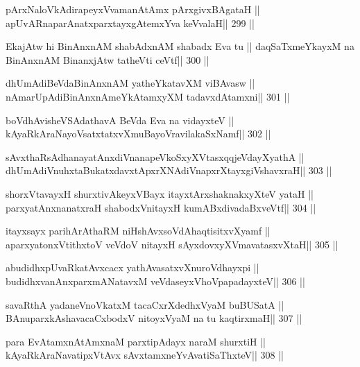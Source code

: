 \begin{shl}
pArxNaloVkAdirapeyxVvamanAtAmx pArxgivxBAgataH ||
apUvARnaparAnatxparxtayxgAtemxYva keVvalaH\hfill || 299 ||
\end{shl}

\begin{shl}
EkajAtw hi BinAnxnAM shabAdxnAM shabadx Eva tu ||
daqSaTxmeYkayxM na BinAnxnAM BinanxjAtw tatheVti ceVtf\hfill || 300 ||
\end{shl}

\begin{shl}
dhUmAdiBeVdaBinAnxnAM yatheYkatavXM viBAvasw ||
nAmarUpAdiBinAnxnAmeYkAtamxyXM tadavxdAtamxni\hfill || 301 ||
\end{shl}

\begin{shl}
boVdhAvisheVSAdathavA BeVda Eva na vidayxteV ||
kAyaRkAraNayoVsatxtatxvXmuBayoVravilakaSxNamf\hfill || 302 ||
\end{shl}

\begin{shl}
sAvxthaRsAdhanayatAnxdiVnanapeVkoSxyXVtasxqqjeVdayXyathA ||
dhUmAdiVnuhxtaBukatxdavxtApxrXNAdiVnapxrXtayxgiVshavxraH\hfill || 303 ||
\end{shl}

\begin{shl}
shorxVtavayxH shurxtivAkeyxVBayx itayxtArx\s\s shaknakxyXteV yataH ||
parxyatAnxnanatxraH shabodxV\s nitayxH kumABxdivadaBxveVtf\hfill || 304 ||
\end{shl}

\begin{shl}
itayxsayx parihArAthaRM niHshAvxsoVdAhaqtisitxvXyamf ||
aparxyatonxVtithxtoV veVdoV nitayxH sAyxdovxyXVmavatasxvXtaH\hfill || 305 ||
\end{shl}

\begin{shl}
abudidhxpUvaRkatAvxcacx yathAvasatxvXnuroVdhayxpi ||
budidhxvanAnxparxmANatavxM veVdaseyxVhoVpapadayxteV\hfill || 306 ||
\end{shl}

\begin{shl}
savaRthA yadaneVnoVkatxM tacaCxrXdedhxVyaM buBUSatA ||
BAnuparxkAshavacaCxbodxV nitoyxV\s yaM na tu kaqtirxmaH\hfill || 307 ||
\end{shl}

\begin{shl}
para EvA\s\s tamxnA\s\s tAmxnaM parxtipAdayx naraM shurxtiH ||
kAyaRkAraNavatipxVtAvx sAvxtamxneYvAvatiSaThxteV\hfill || 308 ||
\end{shl}

